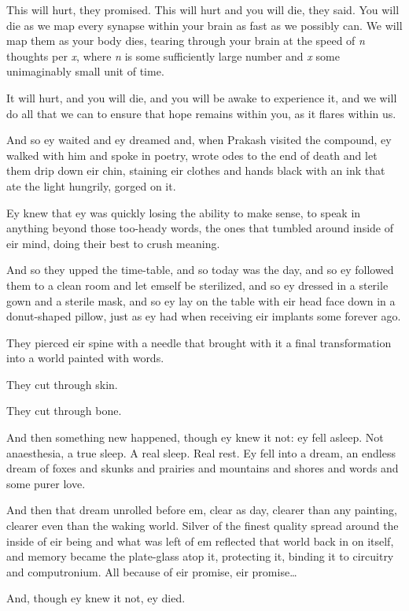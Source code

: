 This will hurt, they promised. This will hurt and you will die, they said. You will die as we map every synapse within your brain as fast as we possibly can. We will map them as your body dies, tearing through your brain at the speed of \emph{n} thoughts per \emph{x}, where \emph{n} is some sufficiently large number and \emph{x} some unimaginably small unit of time.

It will hurt, and you will die, and you will be awake to experience it, and we will do all that we can to ensure that hope remains within you, as it flares within us.

And so ey waited and ey dreamed and, when Prakash visited the compound, ey walked with him and spoke in poetry, wrote odes to the end of death and let them drip down eir chin, staining eir clothes and hands black with an ink that ate the light hungrily, gorged on it.

Ey knew that ey was quickly losing the ability to make sense, to speak in anything beyond those too-heady words, the ones that tumbled around inside of eir mind, doing their best to crush meaning.

And so they upped the time-table, and so today was the day, and so ey followed them to a clean room and let emself be sterilized, and so ey dressed in a sterile gown and a sterile mask, and so ey lay on the table with eir head face down in a donut-shaped pillow, just as ey had when receiving eir implants some forever ago.

They pierced eir spine with a needle that brought with it a final transformation into a world painted with words.

They cut through skin.

They cut through bone.

And then something new happened, though ey knew it not: ey fell asleep. Not anaesthesia, a true sleep. A real sleep. Real rest. Ey fell into a dream, an endless dream of foxes and skunks and prairies and mountains and shores and words and some purer love.

And then that dream unrolled before em, clear as day, clearer than any painting, clearer even than the waking world. Silver of the finest quality spread around the inside of eir being and what was left of em reflected that world back in on itself, and memory became the plate-glass atop it, protecting it, binding it to circuitry and computronium. All because of eir promise, eir promise\ldots

And, though ey knew it not, ey died.

